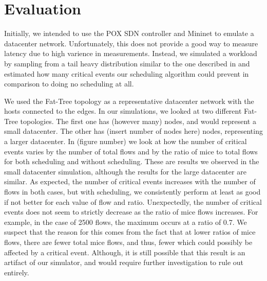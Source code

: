 \section{Evaluation}
Initially, we intended to use the POX SDN controller and Mininet to emulate a
datacenter network. Unfortunately, this does not provide a good way to measure
latency due to high varience in measurements. Instead, we simulated a workload
by sampling from a tail heavy distribution similar to the one described in
\cite{dctcp} and estimated how many critical events our scheduling algorithm
could prevent in comparison to doing no scheduling at all.

\iffalse this stuff was in here originally, might have some material that's
good to have on hand, idk... Also, I think here's where you would describe the
simulator, including how stuff's parameterizable

We can also test our system in a real-world setting by setting up a small datacenter topology in Cloudlab and running it with network workloads to evaluate the performance of our system on a physical network.  The different axes of evaluation are as follows: latency suffered by the mice flows, size of queue buildup and performance of the system in terms of overhead of measurement, classification and scheduling. 

\fi

We used the Fat-Tree topology \cite{fattree} as a representative datacenter
network with the hosts connected to the edges. In our simulations, we looked at
two different Fat-Tree topologies. The first one has (however many) nodes, and
would represent a small datacenter. The other has (insert number of nodes here)
nodes, representing a larger datacenter. In (figure number) we look at how the
number of critical events varies by the number of total flows and by the ratio
of mice to total flows for both scheduling and without scheduling. These are
results we observed in the small datacenter simulation, although the results
for the large datacenter are similar. As expected, the number of critical events
increases with the number of flows in both cases, but with scheduling, we 
consistently perform at least as good if not better for each value of flow and
ratio. Unexpectedly, the number of critical events does not seem to strictly
decrease as the ratio of mice flows increases. For example, in the case of 2500
flows, the maximum occurs at a ratio of 0.7. We suspect that the reason for this
comes from the fact that at lower ratios of mice flows, there are fewer total
mice flows, and thus, fewer which could possibly be affected by a critical
event. Although, it is still possible that this result is an artifact of our
simulator, and would require further investigation to rule out entirely.

